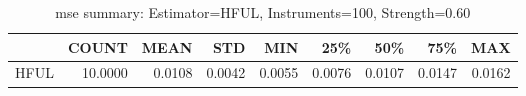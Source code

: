 \begin{table}[ht]
\centering
\caption{mse summary: Estimator=HFUL, Instruments=100, Strength=0.60}
\begin{tabular}{lrrrrrrrr}
\toprule
 & COUNT & MEAN & STD & MIN & 25\% & 50\% & 75\% & MAX \\
\midrule
HFUL & 10.0000 & 0.0108 & 0.0042 & 0.0055 & 0.0076 & 0.0107 & 0.0147 & 0.0162 \\
\bottomrule
\end{tabular}
\end{table}
